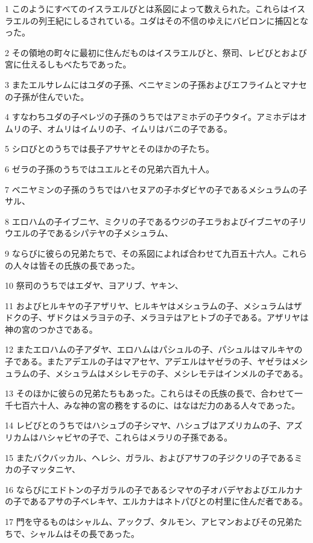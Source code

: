 \par 1 このようにすべてのイスラエルびとは系図によって数えられた。これらはイスラエルの列王紀にしるされている。ユダはその不信のゆえにバビロンに捕囚となった。
\par 2 その領地の町々に最初に住んだものはイスラエルびと、祭司、レビびとおよび宮に仕えるしもべたちであった。
\par 3 またエルサレムにはユダの子孫、ベニヤミンの子孫およびエフライムとマナセの子孫が住んでいた。
\par 4 すなわちユダの子ペレヅの子孫のうちではアミホデの子ウタイ。アミホデはオムリの子、オムリはイムリの子、イムリはバニの子である。
\par 5 シロびとのうちでは長子アサヤとそのほかの子たち。
\par 6 ゼラの子孫のうちではユエルとその兄弟六百九十人。
\par 7 ベニヤミンの子孫のうちではハセヌアの子ホダビヤの子であるメシュラムの子サル、
\par 8 エロハムの子イブニヤ、ミクリの子であるウジの子エラおよびイブニヤの子リウエルの子であるシパテヤの子メシュラム、
\par 9 ならびに彼らの兄弟たちで、その系図によれば合わせて九百五十六人。これらの人々は皆その氏族の長であった。
\par 10 祭司のうちではエダヤ、ヨアリブ、ヤキン、
\par 11 およびヒルキヤの子アザリヤ、ヒルキヤはメシュラムの子、メシュラムはザドクの子、ザドクはメラヨテの子、メラヨテはアヒトブの子である。アザリヤは神の宮のつかさである。
\par 12 またエロハムの子アダヤ、エロハムはパシュルの子、パシュルはマルキヤの子である。またアデエルの子はマアセヤ、アデエルはヤゼラの子、ヤゼラはメシュラムの子、メシュラムはメシレモテの子、メシレモテはインメルの子である。
\par 13 そのほかに彼らの兄弟たちもあった。これらはその氏族の長で、合わせて一千七百六十人、みな神の宮の務をするのに、はなはだ力のある人々であった。
\par 14 レビびとのうちではハシュブの子シマヤ、ハシュブはアズリカムの子、アズリカムはハシャビヤの子で、これらはメラリの子孫である。
\par 15 またバクバッカル、ヘレシ、ガラル、およびアサフの子ジクリの子であるミカの子マッタニヤ、
\par 16 ならびにエドトンの子ガラルの子であるシマヤの子オバデヤおよびエルカナの子であるアサの子ベレキヤ、エルカナはネトパびとの村里に住んだ者である。
\par 17 門を守るものはシャルム、アックブ、タルモン、アヒマンおよびその兄弟たちで、シャルムはその長であった。
